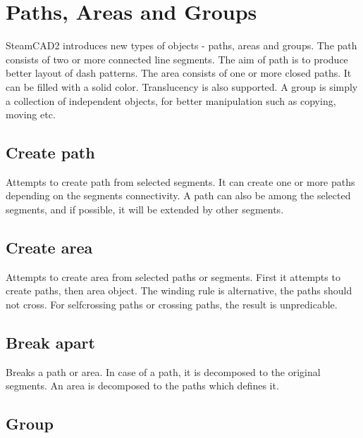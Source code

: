 \chapter{Paths, Areas and Groups}\label{chap:chap4}

SteamCAD2 introduces new types of objects - paths, areas and groups. The path consists of
two or more connected line segments. The aim of path is to produce better layout of dash patterns.
The area consists of one or more closed paths. It can be filled with a solid color. Translucency
is also supported. A group is simply a collection of independent objects, for better manipulation
such as copying, moving etc.

\section{Create path}\label{sec:createpath}

Attempts to create path from selected segments. It can create one or more paths depending on
the segments connectivity. A path can also be among the selected segments, and if possible,
it will be extended by other segments.

\section{Create area}\label{sec:createarea}

Attempts to create area from selected paths or segments. First it attempts to create paths,
then area object. The winding rule is alternative, the paths should not cross. For selfcrossing
paths or crossing paths, the result is unpredicable.

\section{Break apart}\label{sec:breakapart}

Breaks a path or area. In case of a path, it is decomposed to the original segments. An area
is decomposed to the paths which defines it.

\section{Group}\label{sec:group}

